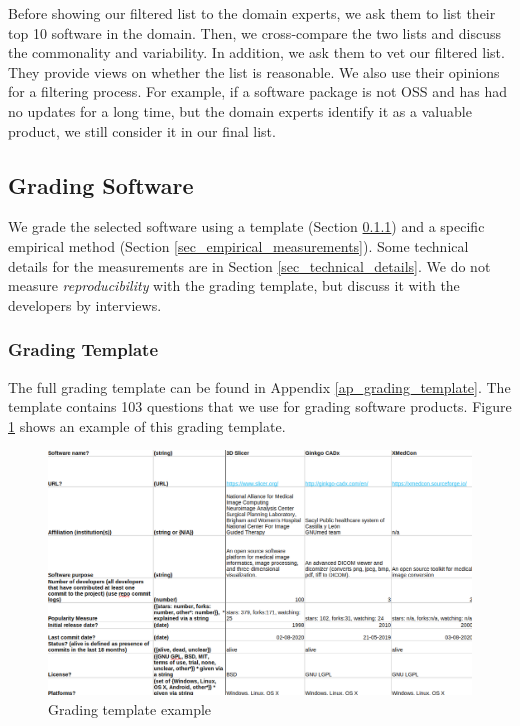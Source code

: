 \documentclass[3p, 12pt,authoryear]{elsarticle}
\begin{document}
Before showing our filtered list to the domain experts, we ask them to list
their top 10 software in the domain. Then, we cross-compare the two lists and
discuss the commonality and variability.  In addition, we ask them to vet our
filtered list. They provide views on whether the list is reasonable. We also use
their opinions for a filtering process. For example, if a software package is
not OSS and has had no updates for a long time, but the domain experts identify
it as a valuable product, we still consider it in our final list.

\subsection{Grading Software} \label{sec_grading_software}

We grade the selected software using a template (Section
\ref{sec_grading_template}) and a specific empirical method (Section
\ref{sec_empirical_measurements}). Some technical details for the measurements
are in Section \ref{sec_technical_details}.  We do not measure
\textit{reproducibility} with the grading template, but discuss it with the
developers by interviews.

\subsubsection{Grading Template} \label{sec_grading_template}

The full grading template can be found in Appendix \ref{ap_grading_template}.
The template contains 103 questions that we use for grading software products.
Figure \ref{fg_grading_template_example} shows an example of this grading
template.

\begin{figure}[ht]
\includegraphics[scale=0.42]{figures/template.png}
\caption{Grading template example}
\label{fg_grading_template_example}
\end{figure}
\end{document}
